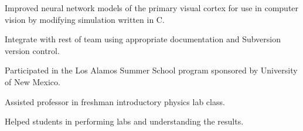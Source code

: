 \documentclass[]{deedy-resume-openfont}
\begin{document}
\begin{minipage}[t]{0.63\textwidth}
\begin{tightemize}
	\regdescript
\item Improved neural network models of the primary visual cortex for use in computer vision by modifying simulation written in C.\\
\item Integrate with rest of team using appropriate documentation and Subversion version control.\\
\item Participated in the Los Alamos Summer School program sponsored by University of New
Mexico.
\end{tightemize}
\sectionsep


\begin{tightemize}
	\regdescript
	\item Assisted professor in freshman introductory physics lab class.\\
	\item  Helped students in performing labs and understanding the results.\\
\end{tightemize}
\sectionsep


\end{minipage}
\end{document}
